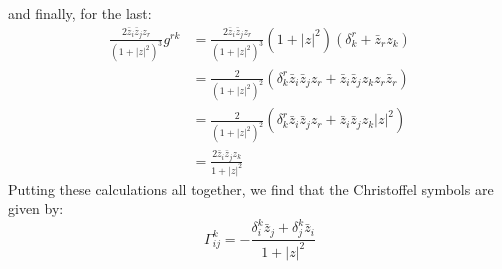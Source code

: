 \documentclass[11pt]{amsart}
\theoremstyle{definition}
\begin{document}
%
and finally, for the last:
%
\begin{align*}
\frac{ 2 \bar{z}_i \bar{z}_j z_r }{ (1 + |z|^2)^3 } g^{rk} &= \frac{ 2 \bar{z}_i \bar{z}_j z_r }{ (1 + |z|^2)^3 } (1 + |z|^2)( \delta^r_k + \bar{z}_r z_k ) \\
&= \frac{2}{(1 + |z|^2)^2}( \delta^r_k \bar{z}_i \bar{z}_j z_r + \bar{z}_i \bar{z}_j z_k z_r \bar{z}_r ) \\
&= \frac{2}{(1 + |z|^2)^2}( \delta^r_k \bar{z}_i \bar{z}_j z_r + \bar{z}_i \bar{z}_j z_k |z|^2 ) \\
&= \frac{2 \bar{z}_i \bar{z}_j z_k }{1 + |z|^2}
\end{align*}
%
Putting these calculations all together, we find that the Christoffel symbols are given by:
%
$$ \Gamma^k_{ij} = - \frac{ \delta^k_i \bar{z}_j + \delta^k_j \bar{z}_i }{ 1 + |z|^2 } $$
\end{document}
